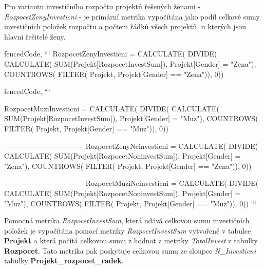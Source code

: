 \documentclass[
  digital,     %
  twoside,     %
  lof,         %
  lot,         %
]{fithesis4}
\begin{document}
Pro variantu investičního rozpočtu projektů řešených ženami - \emph{RozpocetZenyInvesticni} - je primární metrika vypočítána jako podíl celkové sumy investičních položek rozpočtu a počtem řádků všech projektů, u kterých jsou hlavní řešitelé ženy.
\begin{tcolorbox}
\begin{markdown*}{%
  fencedCode,
}
```
RozpocetZenyInvesticni =                    
    CALCULATE(
        DIVIDE(
            CALCULATE(
                SUM(Projekt[RozpocetInvestSum]),
                Projekt[Gender] = "Zena"),
            COUNTROWS(
                FILTER(
                    Projekt,
                    Projekt[Gender] == "Zena")),
                0))

\end{markdown*}
\end{tcolorbox}
\begin{tcolorbox}
\begin{markdown*}{%
  fencedCode,
}
```

RozpocetMuziInvesticni =                    
    CALCULATE(
        DIVIDE(
            CALCULATE(
                SUM(Projekt[RozpocetInvestSum]),
                Projekt[Gender] = "Muz"),
            COUNTROWS(
                FILTER(
                    Projekt,
                    Projekt[Gender] == "Muz")),
                0))

––––––––––––––––––––––
RozpocetZenyNeinvesticni =                    
    CALCULATE(
        DIVIDE(
            CALCULATE(
                SUM(Projekt[RozpocetNoninvestSum]),
                Projekt[Gender] = "Zena"),
            COUNTROWS(
                FILTER(
                    Projekt,
                    Projekt[Gender] == "Zena")),
                0))

––––––––––––––––––––––
RozpocetMuziNeinvesticni =                    
    CALCULATE(
        DIVIDE(
            CALCULATE(
                SUM(Projekt[RozpocetNoninvestSum]),
                Projekt[Gender] = "Muz"),
            COUNTROWS(
                FILTER(
                    Projekt,
                    Projekt[Gender] == "Muz")),
                0))
```
\end{markdown*}
\end{tcolorbox}


Pomocná metrika \emph{RozpocetInvestSum}, která udává celkovou sumu investičních položek je vypočítána pomocí metriky \emph{RozpocetInvestSum} vytvořené v tabulce \textbf{Projekt} a která počítá celkovou sumu z hodnot z metriky \emph{TotalInvest} z tabulky \textbf{Rozpocet}. Tato metrika pak poskytuje celkovou sumu ze sloupce \emph{N\_Investicni} tabulky \textbf{Projekt\_rozpocet\_radek}.
\end{document}
